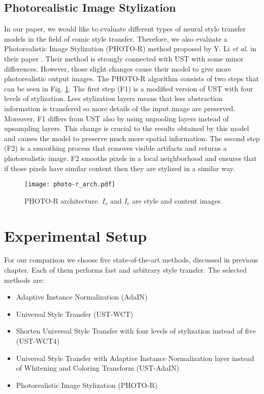 \documentclass{llncs}
\begin{document}
%
\subsection{Photorealistic Image Stylization}
%
In our paper, we would like to evaluate different types of neural style transfer models in the field of comic style transfer. Therefore, we also evaluate a Photorealistic Image Stylization (PHOTO-R) method proposed by Y. Li \textit{et al.} in their paper \cite{photo:real}. Their method is strongly connected with UST with some minor differences. However, those slight changes cause their model to give more photorealistic output images. The PHOTO-R algorithm consists of two steps that can be seen in Fig. \ref{photo-r-arch}. The first step (F1) is a modified version of UST with four levels of stylization. Less stylization layers means that less abstraction information is transfered so more details of the input image are preserved. Moreover, F1 differs from UST also by using unpooling layers instead of upsampling layers. This change is crucial to the results obtained by this model and causes the model to preserve much more spatial information. The second step (F2) is a smoothing process that removes visible artifacts and returns a photorealistic image. F2 smooths pixels in a local neighborhood and ensures that if those pixels have similar content then they are stylized in a similar way. %

\begin{figure}[H]
  \centering
  \texttt{[image: photo-r\_arch.pdf]}
  \caption{PHOTO-R architecture. $I_s$ and $I_c$ are style and content images. \label{photo-r-arch}}
\end{figure}

%
\section{Experimental Setup}
%
For our comparison we choose five state-of-the-art methods, discussed in previous chapter. Each of them performs fast and arbitrary style transfer. The selected methods are:
\begin{itemize}
\item Adaptive Instance Normalization (AdaIN) \cite{huang:belongie}
\item Universal Style Transfer (UST-WCT) \cite{universal:style}
\item Shorten Universal Style Transfer with four levels of stylization instead of five (UST-WCT4)
\item Universal Style Transfer with Adaptive Instance Normalization layer \cite{huang:belongie} instead of Whitening and Coloring Transform \cite{universal:style} (UST-AdaIN)
\item Photorealistic Image Stylization (PHOTO-R) \cite{photo:real}
\end{itemize}
\end{document}
